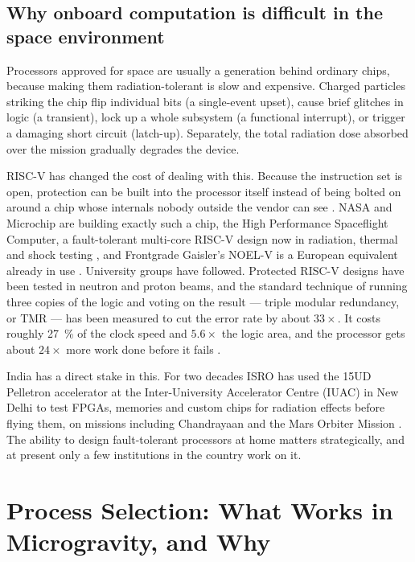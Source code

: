 \documentclass[11pt,a4paper]{article}
\begin{document}
\subsection{Why onboard computation is difficult in the space environment}

Processors approved for space are usually a generation behind ordinary chips,
because making them radiation-tolerant is slow and expensive. Charged particles
striking the chip flip individual bits (a single-event upset), cause brief
glitches in logic (a transient), lock up a whole subsystem (a functional
interrupt), or trigger a damaging short circuit (latch-up). Separately, the total
radiation dose absorbed over the mission gradually degrades the device.

RISC-V has changed the cost of dealing with this. Because the instruction set is
open, protection can be built into the processor itself instead of being bolted on
around a chip whose internals nobody outside the vendor can see
\cite{dimascio2021opensource,riscv_space_micro}. NASA and Microchip are building
exactly such a chip, the High Performance Spaceflight Computer, a fault-tolerant
multi-core RISC-V design now in radiation, thermal and shock testing
\cite{hpsc2024}, and Frontgrade Gaisler's NOEL-V is a European equivalent already
in use \cite{riscv_space_micro}. University groups have followed. Protected RISC-V
designs have been tested in neutron and proton beams, and the standard technique
of running three copies of the logic and voting on the result --- triple modular
redundancy, or TMR --- has been measured to cut the error rate by about
\(33\times\). It costs roughly \SI{27}{\percent} of the clock speed and
\(5.6\times\) the logic area, and the processor gets about \(24\times\) more work
done before it fails \cite{wilson2019neutron}.

India has a direct stake in this. For two decades ISRO has used the 15UD Pelletron
accelerator at the Inter-University Accelerator Centre (IUAC) in New Delhi to test
FPGAs, memories and custom chips for radiation effects before flying them, on
missions including Chandrayaan and the Mars Orbiter Mission
\cite{iuac_annual2024}. The ability to design fault-tolerant processors at home
matters strategically, and at present only a few institutions in the country work
on it.

\section{Process Selection: What Works in Microgravity, and Why}
\end{document}
